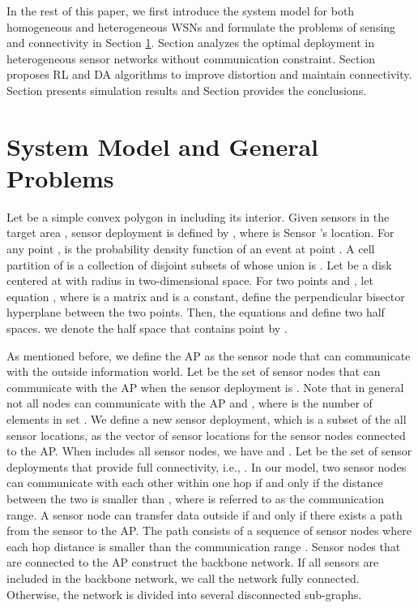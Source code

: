 \documentclass[journal,draftcls,onecolumn,12pt,twoside, narroweqnarray]{IEEEtran}
\begin{document}
In the rest of this paper, we first introduce the system model for both homogeneous and heterogeneous WSNs and formulate the problems of sensing and connectivity in Section \ref{sec:model}. Section \uppercase\expandafter{} analyzes the optimal deployment in heterogeneous sensor networks without communication constraint. Section \uppercase\expandafter{} proposes RL and DA algorithms to improve distortion and maintain connectivity. Section \uppercase\expandafter{} presents simulation results and
Section \uppercase\expandafter{} provides the conclusions.





\section{System Model and General Problems}\label{sec:model}
Let  be a simple convex polygon in  including its interior. Given  sensors in the target area , sensor deployment is defined by , where  is Sensor 's location. For any point ,  is the probability density function of an event at point . A cell partition  of  is a collection of disjoint subsets of  whose union is . Let  be a disk centered at  with radius  in two-dimensional space. For two points  and , let equation , where  is a  matrix and  is a constant, define the perpendicular bisector hyperplane between the two points. Then, the equations  and  define two half spaces. we denote the half space that contains point  by .

As mentioned before, we define the AP as the sensor node that can communicate with the outside information world.
Let  be the set of sensor nodes that can communicate with the AP when the sensor deployment is . Note that in general not all nodes can communicate with the AP and  , where  is the number of elements in set . We define a new sensor deployment, which is a subset of the all sensor locations,  as the vector of sensor locations for the  sensor nodes connected to the AP. When  includes all sensor nodes, we have  and . Let  be the set of sensor deployments that provide full connectivity, i.e., . In our model, two sensor nodes can communicate with each other within one hop if and only if the distance between the two is smaller than , where  is referred to as the communication range.
A sensor node can transfer data outside if and only if there exists a path from the sensor to the AP. The path consists of a sequence of sensor nodes where each hop distance is smaller than the communication range .
Sensor nodes that are connected to the AP construct the backbone network. If all sensors are included in the backbone network, we call the network fully connected. Otherwise, the network is divided into several disconnected sub-graphs.
\end{document}
